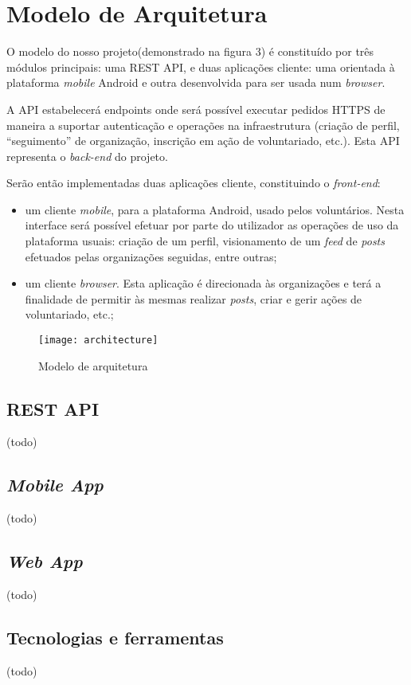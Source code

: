 \section{Modelo de Arquitetura} 
O modelo do nosso projeto(demonstrado na figura 3) é constituído por três módulos principais: uma REST API, e duas aplicações cliente: uma orientada à plataforma \textit{mobile} Android e outra desenvolvida para ser usada num \textit{browser}.
\par \medskip

	A API estabelecerá endpoints onde será possível executar pedidos HTTPS de maneira a suportar autenticação e operações na infraestrutura (criação de perfil, “seguimento” de organização, inscrição em ação de voluntariado, etc.). Esta API representa o \textit{back-end} do projeto.
\par \medskip

Serão então implementadas duas aplicações cliente, constituindo o \textit{front-end}: 
\begin{itemize}
	\item um cliente \textit{mobile}, para a plataforma Android, usado pelos voluntários. Nesta interface será possível efetuar por parte do utilizador as operações de uso da plataforma usuais: criação de um perfil, visionamento de um \textit{feed} de \textit{posts} efetuados pelas organizações seguidas, entre outras;
	\item um cliente \textit{browser}. Esta aplicação é direcionada às organizações e terá a finalidade de permitir às mesmas realizar \textit{posts}, criar e gerir ações de voluntariado, etc.;
\end{itemize}

\begin{figure}[h]
	\texttt{[image: architecture]}
	\caption{Modelo de arquitetura}
\end{figure}

\subsection{REST API}
(todo)

\subsection{\textit{Mobile App}}
(todo)

\subsection{\textit{Web App}}
(todo)

\subsection{Tecnologias e ferramentas}
(todo)